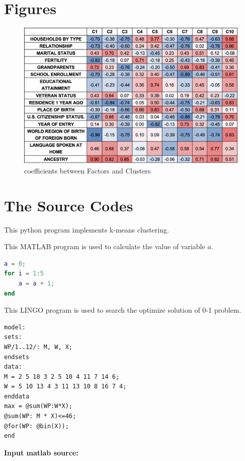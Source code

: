 \documentclass[12pt]{article}
\begin{document}
\clearpage
\begin{appendices}
\section{Figures}
\begin{figure}[H]
	\centering
	\includegraphics[scale=0.5]{./figures/a1.png}
	\caption{coefficients between Factors and Clusters}
\end{figure}

\section{The Source Codes}		%


This python program implements k-means clustering.


This MATLAB program is used to calculate the value of variable $a$.
\begin{lstlisting}[language={Matlab}, caption=\texttt{temp.m}]
a = 0;
for i = 1:5
	a = a + 1;
end
\end{lstlisting}

This LINGO program is used to search the optimize solution of 0-1 problem.
\begin{lstlisting}[language=Lingo, caption=\texttt{temp.lg4}]
model:
sets:
WP/1..12/: M, W, X;
endsets
data:
M = 2 5 18 3 2 5 10 4 11 7 14 6;
W = 5 10 13 4 3 11 13 10 8 16 7 4;
enddata
max = @sum(WP:W*X);
@sum(WP: M * X)<=46;
@for(WP: @bin(X));
end
\end{lstlisting}

\textbf{\textcolor[rgb]{0.98,0.00,0.00}{Input matlab source:}}
% 

\end{appendices}
\end{document}
